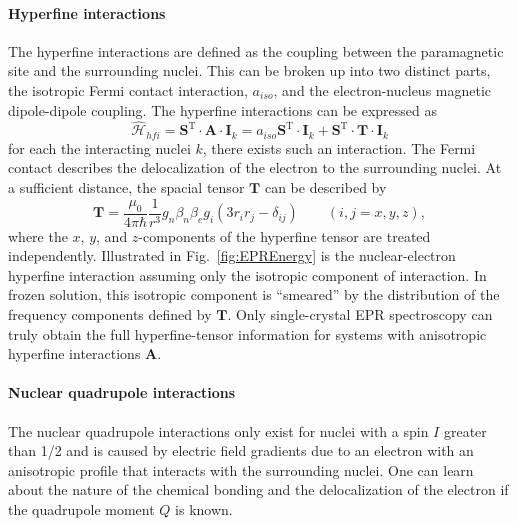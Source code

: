\paragraph*{Hyperfine interactions}
The hyperfine interactions are defined as the coupling between the paramagnetic site and the surrounding nuclei. This can be broken up into two distinct parts, the isotropic Fermi contact interaction, $a_{iso}$, and the electron-nucleus magnetic dipole-dipole coupling. The hyperfine interactions can be expressed as
\begin{equation}
    \hat{\mathcal{H}}_{hfi} = \mathbf{S}^{\text{T}} \cdot \mathbf{A} \cdot \mathbf{I}_k = a_{iso}\mathbf{S}^{\text{T}} \cdot \mathbf{I}_k + \mathbf{S}^{\text{T}} \cdot \mathbf{T} \cdot \mathbf{I}_k \label{eq-2:hfi}
\end{equation}
for each the interacting nuclei $k$, there exists such an interaction. The Fermi contact describes the delocalization of the electron to the surrounding nuclei. At a sufficient distance, the spacial tensor $\mathbf{T}$ can be described by
\begin{equation}
    \mathbf{T} = \frac{\mu_0}{4 \pi \hbar}\frac{1}{r^3} g_n \beta_n \beta_e g_i (3r_i r_j - \delta_{ij}) \qquad (i,j = x,y,z), \label{eq-2:hfiT}
\end{equation}
where the $x$, $y$, and $z$-components of the hyperfine tensor are treated independently. Illustrated in Fig.~\ref{fig:EPREnergy} is the nuclear-electron hyperfine interaction assuming only the isotropic component of interaction. In frozen solution, this isotropic component is ``smeared'' by the distribution of the frequency components defined by $\mathbf{T}$. Only single-crystal EPR spectroscopy can truly obtain the full hyperfine-tensor information for systems with anisotropic hyperfine interactions $\mathbf{A}$.

\paragraph*{Nuclear quadrupole interactions}
The nuclear quadrupole interactions only exist for nuclei with a spin $I$ greater than 1/2 and is caused by electric field gradients due to an electron with an anisotropic profile that interacts with the surrounding nuclei. One can learn about the nature of the chemical bonding and the delocalization of the electron if the quadrupole moment $Q$ is known. 

